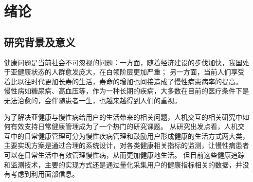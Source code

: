 \chapter{绪论}



\section{研究背景及意义}
健康问题是当前社会不可忽视的问题：一方面，随着经济建设的步伐加快，我国处于亚健康状态的人群愈发庞大，在白领阶层更加严重\cite{health_report2019}；
另一方面，当前人们享受着比以往时代更加长寿的生活，寿命的增加也间接造成了慢性病患病率的提高\cite{OlshanskyDEMOGRAPHY}。
慢性病如糖尿病、高血压等，作为一种长期的疾病，大多数在目前的医疗条件下是无法治愈的，会伴随患者一生，也越来越得到人们的重视\cite{blandford2019hci, lupton2017self-tracking}。

为了解决亚健康与慢性病给用户的生活带来的相关问题，人机交互的相关研究中如何有效支持日常健康管理成为了一个热门的研究课题。
从研究出发点看，人机交互中的日常健康管理可分为慢性疾病管理和鼓励用户形成健康的生活方式两大类，主要实现方案是通过合理的系统设计，对各类健康相关指标的监测，让慢性病患者可以在日常生活中有效管理慢性病，从而更加健康地生活。
但目前这些健康追踪和监测技术，主要的实现方式还是通过量化采集用户的健康指标相关的数据，并没有考虑到利用面部信息。

